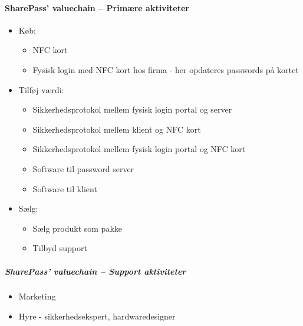 \paragraph{SharePass' valuechain -- Primære aktiviteter}
\begin{itemize}
  \item Køb:
  \begin{itemize}
    \item NFC kort
    \item Fysisk login med NFC kort hos firma - her opdateres passwords på kortet
  \end{itemize}
  \item Tilføj værdi:
  \begin{itemize}
    \item Sikkerhedsprotokol mellem fysisk login portal og server
    \item Sikkerhedsprotokol mellem klient og NFC kort
    \item Sikkerhedsprotokol mellem fysisk login portal og NFC kort
    \item Software til password server
    \item Software til klient
  \end{itemize}
  \item Sælg:
  \begin{itemize}
    \item Sælg produkt som pakke
    \item Tilbyd support
  \end{itemize}
\end{itemize}

\subparagraph*{SharePass' valuechain -- Support aktiviteter}
\begin{itemize}
\item Marketing
\item Hyre - sikkerhedsekspert, hardwaredesigner
\end{itemize}